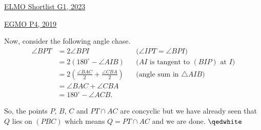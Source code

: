 \begin{problem}{14}{\href{https://artofproblemsolving.com/community/c6h3100572p28033718}{ELMO Shortlist G1, 2023}}
\begin{problem}{6}{\href{https://artofproblemsolving.com/community/q2h1819300p35507923}{EGMO P4, 2019}}
\begin{solution}
	\noindent Now, consider the following angle chase.
	\begin{align*} \angle BPT &=2\angle BPI && \text{($\angle IPT=\angle BPI$)} \\ &=2(180^{\circ}-\angle AIB) && \text{($AI$ is tangent to $(BIP)$ at $I$)}\\ &=2\left(\frac{\angle BAC}{2}+\frac{\angle CBA}{2}\right) && \text{(angle sum in $\triangle AIB$)}\\ &=\angle BAC+\angle CBA\\ &=180^{\circ}-\angle ACB.
	\end{align*}
	\par So, the points $P$, $B$, $C$ and $PT\cap AC$ are concyclic but we have already seen that $Q$ lies on $(PBC)$ which means $Q=PT\cap AC$ and we are done. $\qedwhite$
	\end{solution}
\end{problem}


\end{problem}
